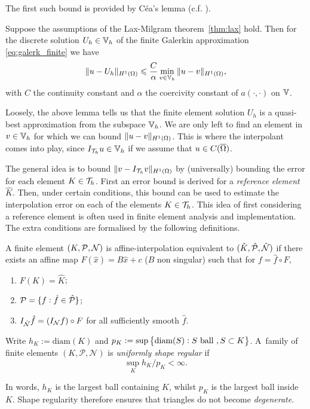 \documentclass[thesis.tex]{subfiles}
\begin{document}
  The first such bound is provided by C\'ea's lemma (c.f. \cite[Thm~2.8.1]{brenner}).
  \begin{lem}
    Suppose the assumptions of the Lax-Milgram theorem~\ref{thm:lax} hold. Then for the discrete solution $U_h \in \VV_h$ of the
    finite Galerkin approximation \eqref{eq:galerk_finite} we have
    \[
      \| u - U_h\|_{H^1(\O)} \leq {C \over \alpha} \min_{v \in \VV_h} \| u - v\|_{H^1(\O)},
    \]
    with $C$ the continuity constant and $\alpha$ the coercivity constant of $a(\cdot, \cdot)$ on $\VV$.
  \end{lem}
  Loosely, the above lemma tells us that the finite element solution $U_h$ is a quasi-best approximation from the subspace $\VV_h$. We are
  only left to find an element in $v \in \VV_h$ for which we can bound $\|u - v\|_{H^1(\O)}$. This is where the interpolant comes into play, since $I_{\T_h}u \in \VV_h$ if we assume that $u \in C(\OO)$.

  The general idea is to bound $\|v - I_{\mathcal{T}_h} v\|_{H^1(\O)}$ 
  by (universally) bounding the error for each element $K \in \T_h$.
  First an error bound is derived for a \emph{reference element}~$\hat K$. 
  Then, under certain conditions, this bound can be used to estimate the interpolation error 
  on each of the elements $K \in \T_h$. This idea of first considering a reference element is often 
  used in finite element analysis and implementation. The extra conditions are formalised by the following definitions.
  \begin{defn}
    A finite element $(K, \P, \N)$ is affine-interpolation equivalent to $(\hat K, \hat \P, \hat \N)$ if there
    exists an affine map $ F(\hat x) = B\hat x + c$ ($B$ non singular) such that for $f = \hat f \circ F$,
    \begin{enumerate}[label=(\roman*)]
      \item $F(K) = \hat K$;
      \item $\P = \{f : \hat f \in \hat \P\}$;
    \item $I_{\hat \N} \hat f = \left( I_{\N} f \right)\circ F$ for all sufficiently smooth $\hat f$.
    \end{enumerate}
  \end{defn}
  \begin{defn}
    Write $h_K := \text{diam}(K)$ and $p_K := \sup\set{\text{diam}(S): S \text{ ball }, S \subset K}$.
    A~family of finite elements $(K, \mathcal{P}, \mathcal{N})$ is \emph{uniformly shape regular} if 
    \[
      \sup_K h_K/p_K < \infty.
    \]
  \end{defn}
  In words,  $h_K$ is the largest ball containing $K$, whilst $p_K$ is the largest ball inside $K$.
  Shape regularity therefore ensures that triangles do not become \emph{degenerate}.
\end{document}
